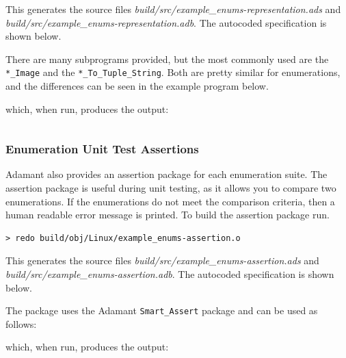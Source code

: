 This generates the source files \textit{build/src/example\_enums-representation.ads} and \textit{build/src/example\_enums-representation.adb}. The autocoded specification is shown below.


There are many subprograms provided, but the most commonly used are the \texttt{*\_Image} and the \texttt{*\_To\_Tuple\_String}. Both are pretty similar for enumerations, and the differences can be seen in the example program below.


which, when run, produces the output:

\vspace{5mm} %
\inputminted{text}{../example_architecture/enum_representation/output.txt}
\vspace{5mm} %

\subsubsection{Enumeration Unit Test Assertions}

Adamant also provides an assertion package for each enumeration suite. The assertion package is useful during unit testing, as it allows you to compare two enumerations. If the enumerations do not meet the comparison criteria, then a human readable error message is printed. To build the assertion package run.

\vspace{5mm} %
\begin{verbatim}
> redo build/obj/Linux/example_enums-assertion.o
\end{verbatim}
\vspace{5mm} %

This generates the source files \textit{build/src/example\_enums-assertion.ads} and \textit{build/src/example\_enums-assertion.adb}. The autocoded specification is shown below.


The package uses the Adamant \texttt{Smart\_Assert} package and can be used as follows:


which, when run, produces the output:


